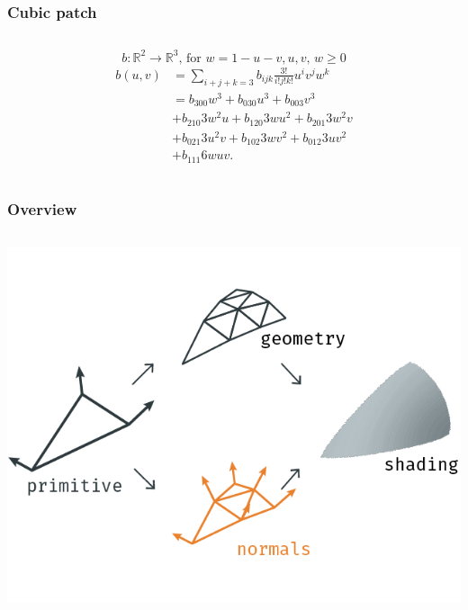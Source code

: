 	\begin{frame}\frametitle{Cubic patch}
		\begin{columns}
			\begin{column}{\textwidth}
				\begin{equation*}
					b: \mathbb{R}^2 \rightarrow \mathbb{R}^3 \text{, for } w = 1 - u - v, u, v \text{, } w \geq 0
				\end{equation*}
				\begin{equation*}
					\begin{aligned}
						b(u,v) & = \sum\limits_{i+j+k=3} b_{ijk} \frac{3!}{i!j!k!} u^i v^j w^k\\
						& = b_{300} w^3 + b_{030} u^3 + b_{003} v^3 \\
						& + b_{210} 3 w^2 u + b_{120} 3 w u^2 + b_{201} 3 w^2 v\\
						& + b_{021} 3 u^2 v + b_{102} 3 w v^2 + b_{012} 3 u v^2\\
						& + b_{111} 6 w u v.
 					\end{aligned}
				\end{equation*}
			\end{column}
		\end{columns}
	\end{frame}

		\begin{frame}\frametitle{Overview}
		\begin{columns}
			\begin{column}{0.9\textwidth}
				\begin{center}	
					\includegraphics[width=\textwidth]{./img/1_single/recap_normals.png}
				\end{center}		
			\end{column}
		\end{columns}
	\end{frame}	

